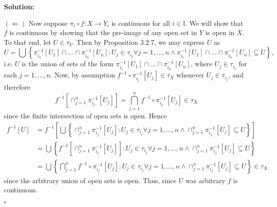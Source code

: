 \documentclass[12pt]{article}
\newcounter{ProofCounter}
\newenvironment{Solution}{\stepcounter{ProofCounter}\textbf{Solution:}}{\hfill$\square$}
\begin{document}
\begin{Solution}
\begin{enumerate}
      $(\Leftarrow)$ Now suppose $\pi_i \circ f : X \rightarrow Y_i$ is continuous for all $i \in \mathbb{I}$. We will show that $f$ is continuous by
      showing that the pre-image of any open set in $Y$ is open in $X$. To that end, let $U \in \tau_Y$. Then by Proposition 3.2.7, we may express $U$
      as 
      \[
        U = \bigcup\left\{ \pi_{i_1}^{-1}[U_1] \cap \dots \cap \pi_{i_n}^{-1}[U_n] : U_{j} \in \tau_{i_j} \forall j = 1,\dots, n \wedge \pi_{i_1}^{-1}[U_1] \cap \dots \cap \pi_{i_n}^{-1}[U_n]
        \subseteq U \right\},
      \]
      i.e. $U$ is the union of sets of the form $\pi_{i_1}^{-1}[U_1] \cap \dots \cap \pi_{i_n}^{-1}[U_n]$, where $U_j \in \tau_{i_j}$ for each $j =
      1,\dots, n$. Now, by assumption $f^{-1}\circ \pi_{i_j}^{-1}[U_{j}] \in \tau_X$ whenever $U_j \in \tau_{i_j}$, and therefore 
      \[
        f^{-1}\left[ \cap_{j=1}^{n}\pi_{i_j}^{-1}[U_j] \right] = \bigcap_{j=1}^{n}f^{-1}\circ \pi_{i_j}^{-1}[U_j] \in \tau_X
      \]
      since the finite intersection of open sets is open. Hence
      \begin{align*}
        f^{-1}[U] & = f^{-1}\left[ \bigcup\left\{ \cap_{j=1}^{n} \pi_{i_j}^{-1}[U_j] : U_{j} \in \tau_{i_j} \forall j = 1,\dots,
            n \wedge \cap_{j=1}^{n}\pi_{i_j}^{-1}[U_j]\subseteq U \right\} \right] \\
            & = \bigcup \left\{ f^{-1}\left[ \cap_{j=1}^{n}\pi_{i_j}^{-1}[U_j] \right] : U_{j} \in \tau_{i_j} \forall j = 1,\dots, n
          \wedge \cap_{j=1}^{n}\pi_{i_j}^{-1}[U_j]\subseteq U \right\}  \\
          & = \bigcup \left\{ \bigcap_{j=1}^{n}f^{-1}\circ \pi_{i_j}^{-1}[U_{j}] : U_{j} \in \tau_{i_j} \forall j = 1,\dots, n \wedge \cap_{j=1}^n \pi_{i_j}^{-1}[U_j]\subseteq U \right\} 
          \in \tau_X
      \end{align*}
      since the arbitrary union of open sets is open. Thus, since $U$ was arbitrary $f$ is continuous.


\end{enumerate}
\end{Solution}
\end{document}
